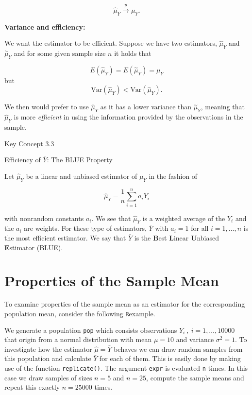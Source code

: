 \documentclass[]{book}
\theoremstyle{definition}
\theoremstyle{definition}
\theoremstyle{definition}
\theoremstyle{remark}
\begin{document}
\[ \hat\mu_Y \xrightarrow{p} \mu_Y. \]

\textbf{Variance and efficiency:}

We want the estimator to be efficient. Suppose we have two estimators,
\(\hat\mu_Y\) and \(\overset{\sim}{\mu}_Y\) and for some given sample
size \(n\) it holds that

\[ E(\hat\mu_Y) = E(\overset{\sim}{\mu}_Y) = \mu_Y \] but
\[\text{Var}(\hat\mu_Y) < \text{Var}(\overset{\sim}{\mu}_Y).\]

We then would prefer to use \(\hat\mu_Y\) as it has a lower variance
than \(\overset{\sim}{\mu}_Y\), meaning that \(\hat\mu_Y\) is more
\emph{efficient} in using the information provided by the observations
in the sample.

Key Concept 3.3

Efficiency of \(\overline{Y}\): The BLUE Property

Let \(\hat\mu_Y\) be a linear and unbiased estimator of \(\mu_Y\) in the
fashion of

\[ \hat\mu_Y = \frac{1}{n} \sum_{i=1}^n a_i Y_i\]

with nonrandom constants \(a_i\). We see that \(\hat\mu_Y\) is a
weighted average of the \(Y_i\) and the \(a_i\) are weights. For these
type of estimators, \(\overline{Y}\) with \(a_i = 1\) for all
\(i = 1, \dots, n\) is the most efficient estimator. We say that
\(\overline{Y}\) is the \textbf{B}est \textbf{L}inear \textbf{U}nbiased
\textbf{E}stimator (BLUE).

\section{Properties of the Sample
Mean}\label{properties-of-the-sample-mean}

To examine properties of the sample mean as an estimator for the
corresponding population mean, consider the following \texttt{R}example.

We generate a population \texttt{pop} which consists observations
\(Y_i \ , \ i=1,\dots,10000\) that origin from a normal distribution
with mean \(\mu = 10\) and variance \(\sigma^2 = 1\). To investigate how
the estimator \(\hat{\mu} = \bar{Y}\) behaves we can draw random samples
from this population and calculate \(\bar{Y}\) for each of them. This is
easily done by making use of the function \texttt{replicate()}. The
argument \texttt{expr} is evaluated \texttt{n} times. In this case we
draw samples of sizes \(n=5\) and \(n=25\), compute the sample means and
repeat this exactly \(n=25000\) times.
\end{document}
